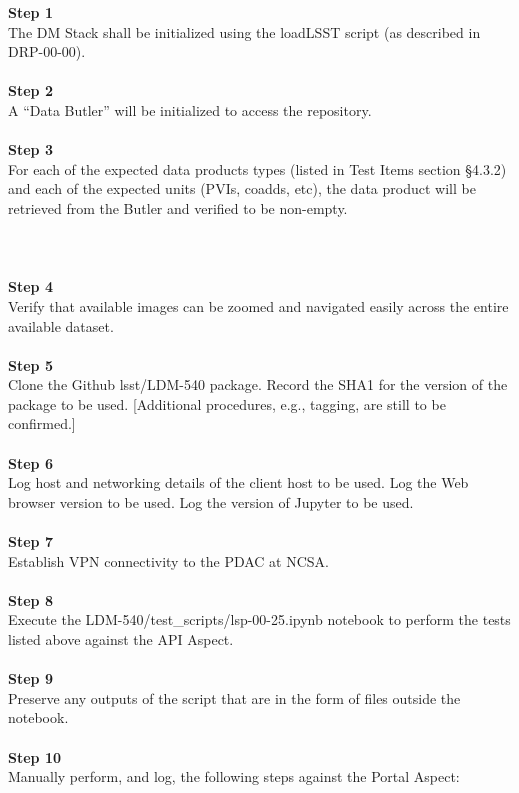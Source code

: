 \textbf{Step 1}\\
The DM Stack shall be initialized using the loadLSST script (as
described in DRP-00-00).\\
~\\
\textbf{Step 2}\\
A ``Data Butler'' will be initialized to access the repository.\\
~\\
\textbf{Step 3}\\
For each of the expected data products types (listed in Test Items
section §4.3.2) and each of the expected units (PVIs, coadds, etc), the
data product will be retrieved from the Butler and verified to be
non-empty.\\
~\\
~\\
~\\
\textbf{Step 4}\\
Verify that available images can be zoomed and navigated easily across
the entire available dataset.\\
~\\
\textbf{Step 5}\\
Clone the Github lsst/LDM-540 package. Record the SHA1 for the version
of the package to be used. {[}Additional procedures, e.g., tagging, are
still to be confirmed.{]}\\
~\\
\textbf{Step 6}\\
Log host and networking details of the client host to be used. Log the
Web browser version to be used. Log the version of Jupyter to be used.\\
~\\
\textbf{Step 7}\\
Establish VPN connectivity to the PDAC at NCSA.\\
~\\
\textbf{Step 8}\\
\emph{}Execute the LDM-540/test\_scripts/lsp-00-25.ipynb notebook to
perform the tests listed above against the API Aspect.\\
~\\
\textbf{Step 9}\\
Preserve any outputs of the script that are in the form of files outside
the notebook.\\
~\\
\textbf{Step 10}\\
Manually perform, and log, the following steps against the Portal
Aspect:

